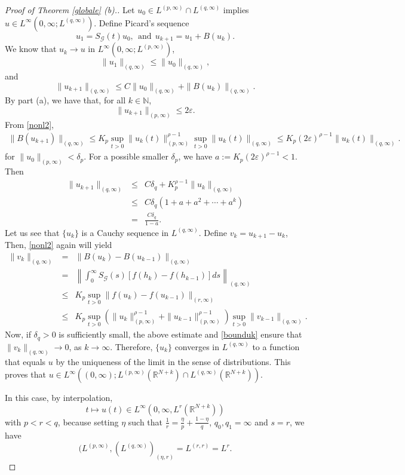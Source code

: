 \documentclass[12pt]{amsart}
\newcommand{\R}{\mathbb{R}}
\newcommand{\N}{\mathbb{N}}
\begin{document}
\begin{proof}[Proof of Theorem \ref{globale} (b).]
	Let $u_0\in L^{(p,\infty)}\cap L^{(q,\infty)}$ implies $u \in L^{\infty}(0,\infty; L^{(q,\infty)})$. Define Picard's sequence
	$$u_1=S_{\mathcal{G}}(t)u_0, \ \  \mbox{and}\ \ u_{k+1}=u_1+B(u_k).$$ 
	We know that $u_k\rightarrow u$ in $L^{\infty}(0,\infty; L^{(p,\infty)})$, 
	$$\|u_1\|_{(q,\infty)}\leq \|u_0\|_{(q,\infty)} ,$$ 
	and 
	$$\|u_{k+1}\|_{(q,\infty)}\leq C\|u_0\|_{(q,\infty)}+\|B(u_k)\|_{(q,\infty)} . $$
	By part (a), we have that, for all $k\in\N$,
	$$\|u_{k+1}\|_{(p,\infty)}\leq 2\varepsilon. $$
	From \eqref{nonl2}, 
	\begin{eqnarray*}
		\|B(u_{k+1})\|_{(q,\infty)}\leq K_p\sup_{t>0} \|u_k(t)\|^{\rho -1}_{(p,\infty)}\sup_{t>0} \|u_k(t)\|_{(q,\infty)} \leq K_p(2\varepsilon)^{\rho-1} \|u_k(t)\|_{(q,\infty)} .
	\end{eqnarray*}
	for $\|u_0\|_{(p,\infty)}<\delta_p$. For a possible smaller $\delta_p$, we have $a:=K_p(2\varepsilon)^{\rho-1}<1$. Then
	\begin{eqnarray}
		\|u_{k+1}\|_{(q,\infty)} &\leq& C\delta_q+K_p^{\rho-1}\|u_k\|_{(q,\infty)} \nonumber\\
		&\leq& C\delta_q(1+a+a^2+\cdots +a^k)\\
		&=& \frac{C \delta_q}{1-a} . \label{bounduk}
	\end{eqnarray}
	Let us see that $\{u_k\}$ is a Cauchy sequence in $L^{(q,\infty)}$. Define $v_k=u_{k+1}-u_k$, Then, \eqref{nonl2} again will yield
	\begin{eqnarray*}
		\|v_k\|_{(q,\infty)}&=&\|B(u_k)-B(u_{k-1})\|_{(q,\infty)}\\
		&=&\left\|\int^{\infty}_0S_{\mathcal{G}}(s)[f(h_k)-f(h_{k-1})]ds\right\|_{(q,\infty)}\\
		&\leq& K_p\sup_{t>0}\|f(u_k)-f(u_{k-1})\|_{(r,\infty)}\\
		&\leq& K_p \sup_{t>0}\left(\|u_k\|_{(p,\infty)}^{\rho-1}+\|u_{k-1}\|_{(p,\infty)}^{\rho-1}\right)\sup_{t>0}\|v_{k-1}\|_{(q,\infty)} .
	\end{eqnarray*}
	Now, if $\delta_q>0$ is sufficiently small, the above estimate and \eqref{bounduk} ensure that $\|v_k\|_{(q,\infty)} \rightarrow0$, as $k\rightarrow \infty$. Therefore, $\{u_k\}$ converges in $L^{(q,\infty)}$ to a function that equals $u$  by the uniqueness of the limit in the sense of distributions. This proves that	$u \in L^\infty((0,\infty); L^{(p,\infty)}(\R^{N+k}) \cap L^{(q,\infty)}(\R^{N+k}))$. 
	
	In this case, by interpolation, 
	\begin{equation}\label{uinLr}
		t\mapsto u(t) \in L^{\infty}(0,\infty,L^r(\mathbb{R}^{N+k}))
	\end{equation}
	with $p<r<q$, because setting $\eta$ such that $\frac{1}{r}=\frac{\eta}{p}+\frac{1-\eta}{q}$, $q_0,q_1=\infty$ and $s=r$, we have 
	\begin{equation*}
		(L^{(p,\infty)},(L^{(q,\infty)})_{(\eta,r)}=L^{(r,r)}=L^r .
	\end{equation*}
	
	
\end{proof}
\end{document}
